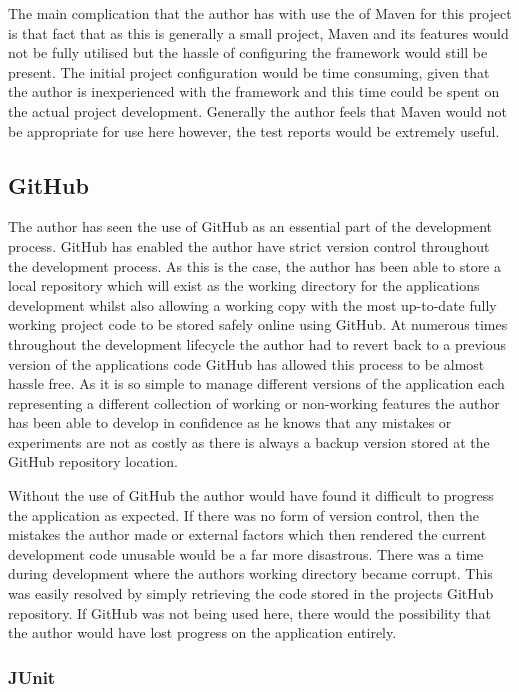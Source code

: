 The main complication that the author has with use the of Maven for this project is that fact that as this is generally a small project, Maven and its features would not be fully utilised but the hassle of configuring the framework would still be present. The initial project configuration would be time consuming, given that the author is inexperienced with the framework and this time could be spent on the actual project development. Generally the author feels that Maven would not be appropriate for use here however, the test reports would be extremely useful.

\subsection{GitHub}

The author has seen the use of GitHub as an essential part of the development process. GitHub has enabled the author have strict version control throughout the development process. As this is the case, the author has been able to store a local repository which will exist as the working directory for the applications development whilst also allowing a working copy with the most up-to-date fully working project code to be stored safely online using GitHub. At numerous times throughout the development lifecycle the author had to revert back to a previous version of the applications code GitHub has allowed this process to be almost hassle free. As it is so simple to manage different versions of the application each representing a different collection of working or non-working features the author has been able to develop in confidence as he knows that any mistakes or experiments are not as costly as there is always a backup version stored at the GitHub repository location.

Without the use of GitHub the author would have found it difficult to progress the application as expected. If there was no form of version control, then the mistakes the author made or external factors which then rendered the current development code unusable would be a far more disastrous. There was a time during development where the authors working directory became corrupt. This was easily resolved by simply retrieving the code stored in the projects GitHub repository. If GitHub was not being used here, there would the possibility that the author would have lost progress on the application entirely.

\subsubsection{JUnit}
\label{junitsupport}


